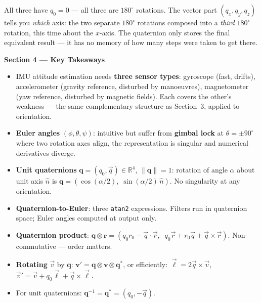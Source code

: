 \documentclass[12pt, a4paper]{article}
\begin{document}
\begin{warnbox}
  All three have $q_0 = 0$ --- all three are $180^\circ$ rotations.
  The vector part $(q_x, q_y, q_z)$ tells you \emph{which} axis:
  the two separate $180^\circ$ rotations composed into a \emph{third}
  $180^\circ$ rotation, this time about the $x$-axis.
  The quaternion only stores the final equivalent result --- it has no
  memory of how many steps were taken to get there.
\end{warnbox}

\begin{keybox}
  \textbf{Section 4 --- Key Takeaways}
  \begin{itemize}[leftmargin=1.2em, itemsep=2pt]
    \item IMU attitude estimation needs \textbf{three sensor types}:
      gyroscope (fast, drifts), accelerometer (gravity reference, disturbed
      by manoeuvres), magnetometer (yaw reference, disturbed by magnetic
      fields).
      Each covers the other's weakness --- the same complementary structure
      as Section~3, applied to orientation.

    \item \textbf{Euler angles} $(\phi, \theta, \psi)$: intuitive but suffer
      from \textbf{gimbal lock} at $\theta = \pm90^\circ$ where two rotation
      axes align, the representation is singular and numerical derivatives
      diverge.

    \item \textbf{Unit quaternions} $\mathbf{q} = (q_0, \vec{q}) \in
      \mathbb{R}^4$, $\|\mathbf{q}\|=1$: rotation of angle $\alpha$ about
      unit axis $\hat{n}$ is $\mathbf{q} = (\cos(\alpha/2),\;
      \sin(\alpha/2)\,\hat{n})$.
      No singularity at any orientation.

    \item \textbf{Quaternion-to-Euler}: three \texttt{atan2} expressions.
      Filters run in quaternion space; Euler angles computed at output only.

    \item \textbf{Quaternion product}:
      $\mathbf{q}\otimes\mathbf{r} = (q_0 r_0 - \vec{q}\cdot\vec{r},\;\;
      q_0\vec{r} + r_0\vec{q} + \vec{q}\times\vec{r})$.
      Non-commutative --- order matters.

    \item \textbf{Rotating} $\vec{v}$ by $\mathbf{q}$:
      $\mathbf{v}' = \mathbf{q}\otimes\mathbf{v}\otimes\mathbf{q}^*$,
      or efficiently:
      $\vec{\ell} = 2\vec{q}\times\vec{v}$,\;
      $\vec{v}' = \vec{v} + q_0\vec{\ell} + \vec{q}\times\vec{\ell}$.

    \item For unit quaternions: $\mathbf{q}^{-1} = \mathbf{q}^* =
      (q_0, -\vec{q})$.
  \end{itemize}
\end{keybox}
\end{document}
